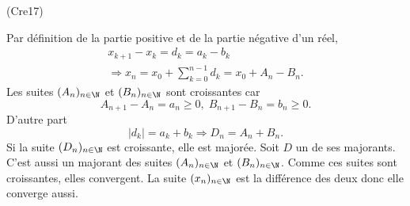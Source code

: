 \begin{tiny}(Cre17)\end{tiny} Par définition de la partie positive et de la partie négative d'un réel,
\begin{multline*}
  x_{k+1} - x_k = d_k = a_k - b_k \\
  \Rightarrow
  x_n = x_0 + \sum_{k=0}^{n-1}d_k 
  = x_0 + A_n - B_n.
\end{multline*}
Les suites $(A_n)_{n\in \N}$ et $(B_n)_{n\in \N}$ sont croissantes car 
\[
  A_{n+1} - A_n = a_n \geq 0, \; B_{n+1} - B_n = b_n \geq 0.
\]
D'autre part 
\[
  |d_k| = a_k + b_k \Rightarrow D_n = A_n + B_n.
\]
Si la suite $(D_n)_{n\in \N}$ est croissante, elle est majorée. Soit $D$ un de ses majorants. C'est aussi un majorant des suites $(A_n)_{n\in \N}$ et $(B_n)_{n\in \N}$. Comme ces suites sont croissantes, elles convergent. La suite $(x_n)_{n\in \N}$ est la différence des deux donc elle converge aussi.
